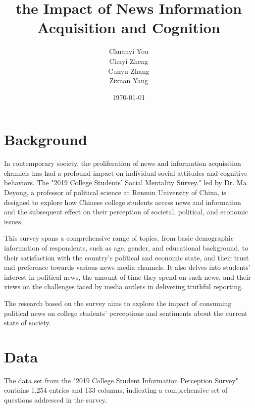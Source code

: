 \documentclass{article}
\title{the Impact of News Information Acquisition and Cognition}
\author{Chuanyi You\\Chuyi Zheng\\Cunyu Zhang\\Zixuan Yang}
\date{\today}
\begin{document}
\maketitle
\tableofcontents
\newpage

\section{Background}

In contemporary society, the proliferation of news and information acquisition channels has had a profound impact on individual social attitudes and cognitive behaviors. The "2019 College Students' Social Mentality Survey," led by Dr. Ma Deyong, a professor of political science at Renmin University of China, is designed to explore how Chinese college students access news and information and the subsequent effect on their perception of societal, political, and economic issues.

This survey spans a comprehensive range of topics, from basic demographic information of respondents, such as age, gender, and educational background, to their satisfaction with the country's political and economic state, and their trust and preference towards various news media channels. It also delves into students' interest in political news, the amount of time they spend on such news, and their views on the challenges faced by media outlets in delivering truthful reporting.

The research based on the survey aims to explore the impact of consuming political news on college students' perceptions and sentiments about the current state of society.

\section{Data}
The data set from the "2019 College Student Information Perception Survey" contains 1,254 entries and 133 columns, indicating a comprehensive set of questions addressed in the survey. 
\end{document}
